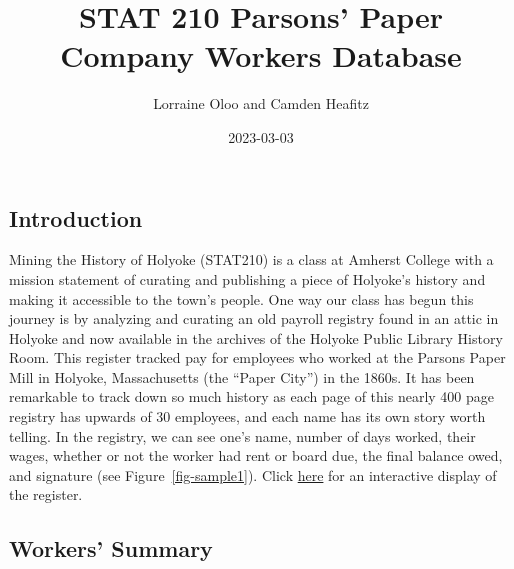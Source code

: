 \documentclass[
  letterpaper,
  DIV=11,
  numbers=noendperiod]{scrartcl}
\title{STAT 210 Parsons' Paper Company Workers Database}
\author{Lorraine Oloo and Camden Heafitz}
\date{2023-03-03}
\renewcommand*\contentsname{Table of contents}
\newcommand\contentsname{Table of contents}
\begin{document}
\maketitle
\ifdefined\Shaded\renewenvironment{Shaded}{\begin{tcolorbox}[borderline west={3pt}{0pt}{shadecolor}, sharp corners, frame hidden, enhanced, interior hidden, boxrule=0pt, breakable]}{\end{tcolorbox}}\fi

\renewcommand*\contentsname{Table of contents}
{
\hypersetup{linkcolor=}
\setcounter{tocdepth}{3}
\tableofcontents
}
\hypertarget{introduction}{%
\subsection{Introduction}\label{introduction}}

Mining the History of Holyoke (STAT210) is a class at Amherst College
with a mission statement of curating and publishing a piece of Holyoke's
history and making it accessible to the town's people. One way our class
has begun this journey is by analyzing and curating an old payroll
registry found in an attic in Holyoke and now available in the archives
of the Holyoke Public Library History Room. This register tracked pay
for employees who worked at the Parsons Paper Mill in Holyoke,
Massachusetts (the ``Paper City'') in the 1860s. It has been remarkable
to track down so much history as each page of this nearly 400 page
registry has upwards of 30 employees, and each name has its own story
worth telling. In the registry, we can see one's name, number of days
worked, their wages, whether or not the worker had rent or board due,
the final balance owed, and signature (see Figure~\ref{fig-sample1}).
Click \href{https://r.amherst.edu/apps/nhorton/Parsons-Paper/}{here} for
an interactive display of the register.

\hypertarget{workers-summary}{%
\subsection{Workers' Summary}\label{workers-summary}}
\end{document}
